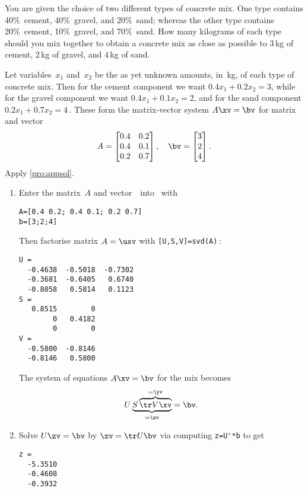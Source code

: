 \begin{example} \label{eg:twotcm} %
You are given the choice of two different types of concrete mix.
One type contains 40\%~cement, 40\%~gravel, and 20\%~sand; whereas the other type contains 20\%~cement, 10\%~gravel, and 70\%~sand.
How many kilograms of each type should you mix together to obtain a concrete mix as close as possible to \(3\)\,kg of cement, \(2\)\,kg of gravel, and \(4\)\,kg of sand.
\begin{solution} 
Let variables~\(x_1\) and~\(x_2\) be the as yet unknown amounts, in~kg, of each type of concrete mix. 
Then for the cement component we want \(0.4x_1+0.2x_2=3\), while for the gravel component we want \(0.4x_1+0.1x_2=2\), and for the sand component \(0.2x_1+0.7x_2=4\)\,.
These form the matrix-vector system \(A\xv=\bv\) for matrix and vector
\begin{equation*}
A=\begin{bmatrix} 0.4&0.2\\0.4&0.1\\0.2&0.7 \end{bmatrix},
\quad \bv=\begin{bmatrix} 3\\2\\4 \end{bmatrix}.
\end{equation*}
Apply \autoref{pro:appsol}.
\begin{enumerate}
\item Enter the matrix~\(A\) and vector~\bv\ into \script\ with
\setbox\ajrqrbox\hbox{}%
\marginpar{\usebox{\ajrqrbox\\[2ex]}}%
\begin{verbatim}
A=[0.4 0.2; 0.4 0.1; 0.2 0.7]
b=[3;2;4]
\end{verbatim}
Then factorise matrix \(A=\usv\) with \verb|[U,S,V]=svd(A)|\,:
\begin{verbatim}
U =
  -0.4638  -0.5018  -0.7302
  -0.3681  -0.6405   0.6740
  -0.8058   0.5814   0.1123
S =
   0.8515        0
        0   0.4182
        0        0
V =
  -0.5800  -0.8146
  -0.8146   0.5800
\end{verbatim}
The system of equations \(A\xv=\bv\) for the mix becomes
\begin{equation*}
U\underbrace{S\overbrace{\tr V\xv}^{=\yv}}_{=\zv}
=\bv.
\end{equation*}
\item Solve \(U\zv=\bv\) by  \(\zv=\tr U\bv\) via computing \verb|z=U'*b| to get
\begin{verbatim}
z =
  -5.3510
  -0.4608
  -0.3932
\end{verbatim}


\end{enumerate}
\end{solution}
\end{example}
